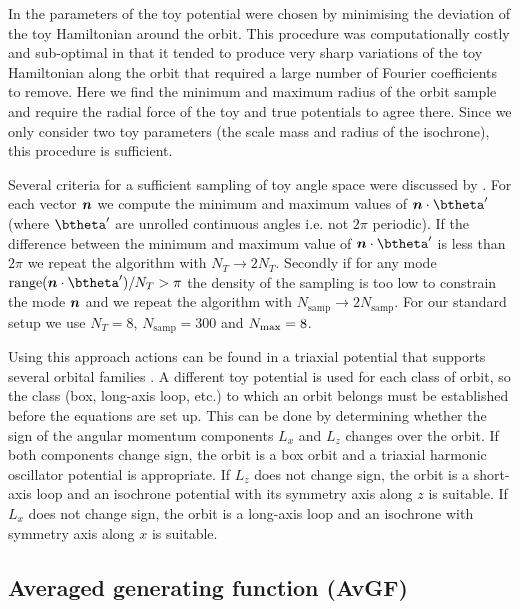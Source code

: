 \documentclass[useAMS,usenatbib,fleqn,a4paper]{mn2e}
\newcommand{\bs}[1]{\bmath{#1}}
\begin{document}
In \cite{SandersBinney2014} the parameters of the toy potential were chosen
by minimising the deviation of the toy Hamiltonian around the orbit. This
procedure was computationally costly and sub-optimal in that it tended to
produce very sharp variations of the toy Hamiltonian along the orbit that
required a large number of Fourier coefficients to remove. Here we find the
minimum and maximum radius of the orbit sample and require the radial force
of the toy and true potentials to agree there. Since we only consider two toy
parameters (the scale mass and radius of the isochrone), this procedure is
sufficient.

Several criteria for a sufficient sampling of toy angle space were discussed
by \cite{SandersBinney2014}. For each vector $\bs{n}$ we compute the minimum
and maximum values of $\bs{n}\cdot\btheta'$ (where $\btheta'$ are unrolled continuous
angles i.e. not $2\pi$ periodic). If the difference between the minimum and
maximum value of $\bs{n}\cdot\btheta'$ is less than $2\pi$ we repeat the algorithm
with $N_T\rightarrow 2N_T$. Secondly if for any mode
$\hbox{range}(\bs{n}\cdot\btheta')/N_T>\pi$ the density of the sampling is too low to
constrain the mode $\bs{n}$ and we repeat the algorithm with
$N_\mathrm{samp}\rightarrow 2N_\mathrm{samp}$. For our standard setup we use
$N_T=8$, $N_\mathrm{samp}=300$ and $N_{\rm max}=8$.

Using this approach actions can be found in a triaxial potential that
supports several orbital families \citep{SandersBinney2014}. A different toy
potential is used for each class of orbit, so the class (box, long-axis loop,
etc.) to which an orbit belongs must be established before the equations are
set up.  This can be done by determining whether the sign of the angular
momentum components $L_x$ and $L_z$ changes over the orbit. If both
components change sign, the orbit is a box orbit and a triaxial harmonic
oscillator potential is appropriate. If $L_z$ does not change sign, the orbit
is a short-axis loop and an isochrone potential with its symmetry axis along
$z$ is suitable. If $L_x$ does not change sign, the orbit is a long-axis loop
and an isochrone with symmetry axis along $x$ is suitable.


\subsection{Averaged generating function (AvGF)}\label{Method::AvGenfunc}
\end{document}
